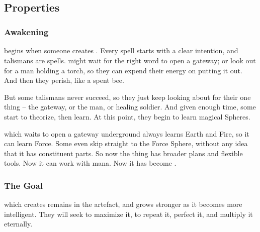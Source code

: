 \section[\Glsfmtplural{artefact}]{~\E}

\begin{multicols}{2}

\subsection{Properties}

\subsubsection{Awakening}
begins when someone creates .
Every spell starts with a clear intention, and \glspl{talisman} are spells.
 might wait for the right word to open a gateway; or look out for a man holding a torch, so they can expend their energy on putting it out.
And then they perish, like a spent bee.

But some \glspl{talisman} never succeed, so they just keep looking about for their one thing -- the gateway, or the man, or healing  soldier.
And given enough time, some start to theorize, then learn.
At this point, they begin to learn magical Spheres.

 which waits to open a gateway underground always learns Earth and Fire, so it can learn Force.
Some even skip straight to the Force Sphere, without any idea that it has constituent parts.
So now the thing has broader plans and flexible tools.
Now it can work with mana.
Now it has become .

\subsubsection{The Goal}
which creates  remains in the \gls{artefact}, and grows stronger as it becomes more intelligent.
They will seek to maximize it, to repeat it, perfect it, and multiply it eternally.


\end{multicols}
